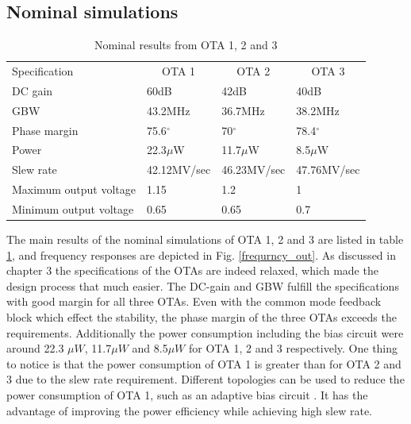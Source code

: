 \subsection{Nominal simulations}

\begin{table}[h]
\centering
\caption{Nominal results from OTA 1, 2 and 3}
\label{nominal_ota}
\begin{tabular}{l|l|l|l}
\hline
\multirow{1}{*}{Specification} & \multicolumn{1}{c|}{OTA 1} & \multicolumn{1}{c|}{OTA 2} & \multicolumn{1}{c}{OTA 3}  \\\cline{1-4}
                       
            DC gain       & 60dB & 42dB & 40dB\\
            GBW      & 43.2MHz & 36.7MHz & 38.2MHz\\
            Phase margin     & 75.6$^\circ$ & 70$^\circ$ & 78.4$^\circ$\\
            Power    & 22.3$\mu$W & 11.7$\mu$W & 8.5$\mu$W\\
            Slew rate   & 42.12MV/sec & 46.23MV/sec & 47.76MV/sec\\
            Maximum output voltage    & 1.15 & 1.2 & 1\\
            Minimum output voltage     & 0.65 & 0.65 & 0.7\\
            
\hline            
\end{tabular}
\end{table}

The main results of the nominal simulations of OTA 1, 2 and 3 are listed in table \ref{nominal_ota}, and frequency responses are depicted in Fig. \ref{frequrncy_out}. As discussed in chapter 3 the specifications of the OTAs are indeed relaxed, which made the design process that much easier. The DC-gain and GBW fulfill the specifications with good margin for all three OTAs. Even with the common mode feedback block which effect the stability, the phase margin of the three OTAs exceeds the requirements. Additionally the power consumption including the bias circuit were around 22.3 $\mu W$, 11.7$\mu W$ and 8.5$\mu W$ for OTA 1, 2 and 3 respectively. One thing to notice is that the power consumption of OTA 1 is greater than for OTA 2 and 3 due to the slew rate requirement. Different topologies can be used to reduce the power consumption of OTA 1, such as an adaptive bias circuit \cite{adaptive}. It has the advantage of improving the power efficiency while achieving high slew rate. 

